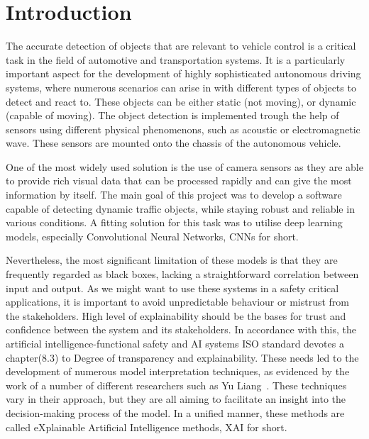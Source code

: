 
\section{Introduction}\label{sec:introduction}

The accurate detection of objects that are relevant to vehicle control is a critical task in the field of automotive and transportation systems.
It is a particularly important aspect for the development of highly sophisticated autonomous driving systems, where numerous scenarios can arise in with different types of objects to detect and react to.
These objects can be either static (not moving), or dynamic (capable of moving).
The object detection is implemented trough the help of sensors using different physical phenomenons, such as acoustic or electromagnetic wave.
These sensors are mounted onto the chassis of the autonomous vehicle.

One of the most widely used solution is the use of camera sensors as they are able to
provide rich visual data that can be processed rapidly and can give the most information by itself.
The main goal of this project was to develop a software capable of detecting dynamic traffic
objects, while staying robust and reliable in various conditions.
A fitting solution for this task was to utilise deep learning models, especially Convolutional Neural Networks, CNNs for short.

Nevertheless, the most significant limitation of these models is that they are frequently regarded as black boxes, lacking a straightforward correlation between input and output.
As we might want to use these systems in a safety critical applications,
it is important to avoid unpredictable behaviour or mistrust from the stakeholders.
High level of explainability should be the bases for trust and confidence between the system and its stakeholders.
In accordance with this, the artificial intelligence-functional safety and AI systems ISO standard\cite{ISO5469:2021} devotes a chapter(8.3) to
Degree of transparency and explainability.
These needs led to the development of numerous model interpretation techniques,
as evidenced by the work of a number of different researchers such as Yu Liang~\cite{LIANG2021168}.
These techniques vary in their approach, but they are all aiming to facilitate an insight into the decision-making process of the model.
In a unified manner, these methods are called eXplainable Artificial Intelligence methods, XAI for short.


